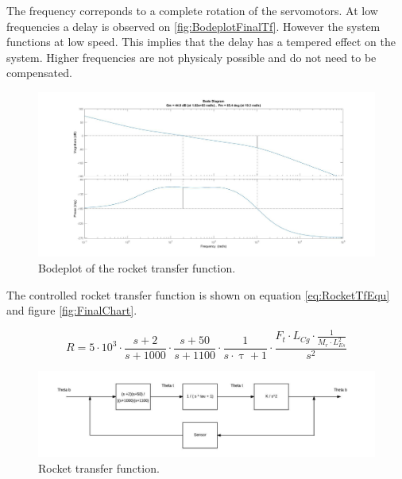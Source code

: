 The frequency correponds to a complete rotation of the servomotors. At low frequencies a delay is observed on \autoref{fig:BodeplotFinalTf}. However the system functions at low speed. This implies that the delay has a tempered effect on the system. Higher frequencies are not physicaly possible and do not need to be compensated.

\begin{figure}[htbp]
	\centering
		\includegraphics[width=\textwidth]{figures/Rocket/design/bodeplot}
		\caption{Bodeplot of the rocket transfer function.}
		\label{fig:BodeplotFinalTf}
\end{figure}

The controlled rocket transfer function is shown on equation \autoref{eq:RocketTfEqu} and figure \autoref{fig:FinalChart}.

\begin{equation}    \label{RocketTfEqu}
R = 5 \cdot 10^3 \cdot \frac{s + 2}{s + 1000} \cdot \frac{s + 50}{s + 1100} \cdot \frac{1}{s \cdot \uptau + 1} \cdot \frac{F_t \cdot L_{Cg} \cdot \frac{1}{M_r \cdot L_{Es}^2}}{s^2}  
\end{equation}

\begin{figure}[htbp]
	\centering
	
	\includegraphics[width=\textwidth]{figures/Rocket/design/final_chart}
	\caption{Rocket transfer function.}
	\label{fig:FinalChart}
	
\end{figure}